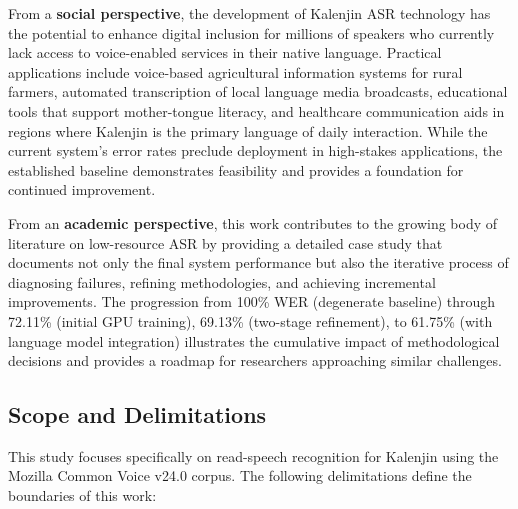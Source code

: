 \documentclass[12pt,a4paper]{article}
\begin{document}
From a \textbf{social perspective}, the development of Kalenjin ASR technology has the potential to enhance digital inclusion for millions of speakers who currently lack access to voice-enabled services in their native language. Practical applications include voice-based agricultural information systems for rural farmers, automated transcription of local language media broadcasts, educational tools that support mother-tongue literacy, and healthcare communication aids in regions where Kalenjin is the primary language of daily interaction. While the current system's error rates preclude deployment in high-stakes applications, the established baseline demonstrates feasibility and provides a foundation for continued improvement.

From an \textbf{academic perspective}, this work contributes to the growing body of literature on low-resource ASR by providing a detailed case study that documents not only the final system performance but also the iterative process of diagnosing failures, refining methodologies, and achieving incremental improvements. The progression from 100\% WER (degenerate baseline) through 72.11\% (initial GPU training), 69.13\% (two-stage refinement), to 61.75\% (with language model integration) illustrates the cumulative impact of methodological decisions and provides a roadmap for researchers approaching similar challenges.

\subsection{Scope and Delimitations}

This study focuses specifically on read-speech recognition for Kalenjin using the Mozilla Common Voice v24.0 corpus. The following delimitations define the boundaries of this work:
\end{document}
